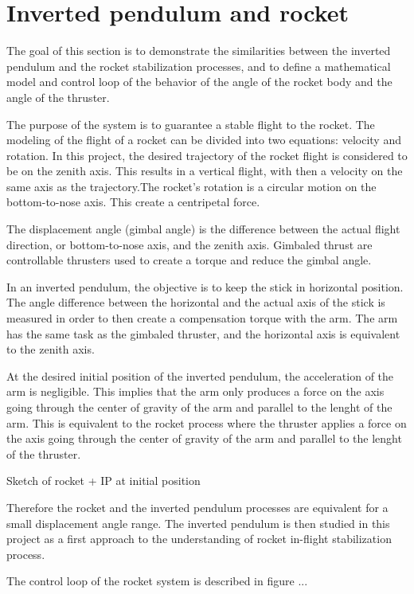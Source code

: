 			
				\section{Inverted pendulum and rocket}
			The goal of this section is to demonstrate the similarities between the inverted pendulum and the rocket stabilization processes, and to define a mathematical model and control loop of the behavior of the angle of the rocket body and the angle of the thruster.
			
			The purpose of the system is to guarantee a stable flight to the rocket.
			The modeling of the flight of a rocket can be divided into two equations: velocity and rotation. In this project, the desired trajectory of the rocket flight is considered to be on the zenith axis. This results in a vertical flight, with then a velocity on the same axis as the trajectory.The rocket's rotation is a circular motion on the bottom-to-nose axis. This create a centripetal force.
			
			The displacement angle (gimbal angle) is the difference between the actual flight direction, or bottom-to-nose axis, and the zenith axis. Gimbaled thrust are controllable thrusters used to create a torque and reduce the gimbal angle. 
			
			In an inverted pendulum, the objective is to keep the stick in horizontal position. The angle difference between the horizontal and the actual axis of the stick is measured in order to then create a compensation torque with the arm. The arm has the same task as the gimbaled thruster, and the horizontal axis is equivalent to the zenith axis.
			
			At the desired initial position of the inverted pendulum, the acceleration of the arm is negligible. This implies that the arm only produces a force on the axis going through the center of gravity of the arm and parallel to the lenght of the arm. This is equivalent to the rocket process where the thruster applies a force on the axis going through the center of gravity of the arm and parallel to the lenght of the thruster. 
			
			 Sketch of rocket + IP at initial position
			
			Therefore the rocket and the inverted pendulum processes are equivalent for a small displacement angle range. The inverted pendulum is then studied in this project as a first approach to the understanding of rocket in-flight stabilization process.
			
			The control loop of the rocket system is described in figure ...
			
